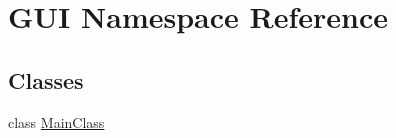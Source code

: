 \hypertarget{namespace_g_u_i}{}\section{G\+UI Namespace Reference}
\label{namespace_g_u_i}
\subsection*{Classes}
\begin{DoxyCompactItemize}
\item 
class \hyperlink{class_g_u_i_1_1_main_class}{Main\+Class}
\end{DoxyCompactItemize}
